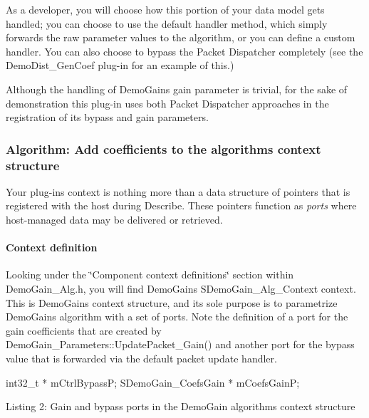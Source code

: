 As a developer, you will choose how this portion of your data model gets handled; you can choose to use the default handler method, which simply forwards the raw parameter values to the algorithm, or you can define a custom handler. You can also choose to bypass the Packet Dispatcher completely (see the {\ttfamily Demo\+Dist\+\_\+\+Gen\+Coef} plug-\/in for an example of this.)

Although the handling of Demo\+Gain\textquotesingle{}s gain parameter is trivial, for the sake of demonstration this plug-\/in uses both Packet Dispatcher approaches in the registration of its bypass and gain parameters.

\hypertarget{a00324_subsection__algorithm_add_coefficients_to_the_algorithms_context_structure}{}\subsubsection{Algorithm\+: Add coefficients to the algorithm\textquotesingle{}s context structure}\label{a00324_subsection__algorithm_add_coefficients_to_the_algorithms_context_structure}
 Your plug-\/in\textquotesingle{}s context is nothing more than a data structure of pointers that is registered with the host during Describe. These pointers function as {\itshape  ports} where host-\/managed data may be delivered or retrieved.

\hypertarget{a00324_subsubsection__context_definition_}{}\paragraph{Context definition}\label{a00324_subsubsection__context_definition_}


 Looking under the \char`\"{}\+Component context definitions\char`\"{} section within Demo\+Gain\+\_\+\+Alg.\+h, you will find Demo\+Gain\textquotesingle{}s {\ttfamily S\+Demo\+Gain\+\_\+\+Alg\+\_\+\+Context} context. This is Demo\+Gain\textquotesingle{}s context structure, and its sole purpose is to parametrize Demo\+Gain\textquotesingle{}s algorithm with a set of ports. Note the definition of a port for the gain coefficients that are created by {\ttfamily Demo\+Gain\+\_\+\+Parameters\+::\+Update\+Packet\+\_\+\+Gain()} and another port for the bypass value that is forwarded via the default packet update handler.




\begin{DoxyCode}
int32\_t               * mCtrlBypassP;
SDemoGain\_CoefsGain   * mCoefsGainP; 
\end{DoxyCode}
  Listing 2\+: Gain and bypass ports in the Demo\+Gain algorithm\textquotesingle{}s context structure

